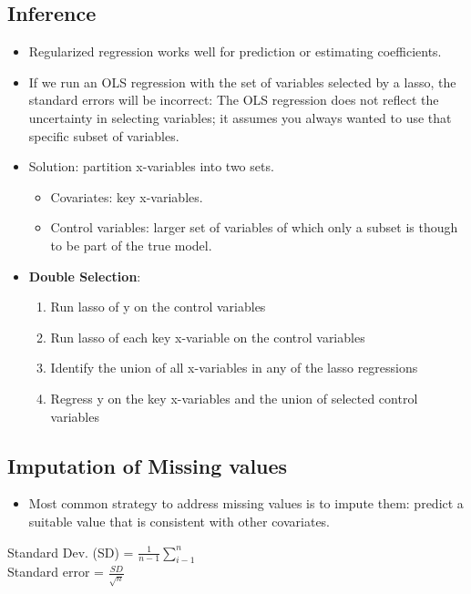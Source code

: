 \documentclass[12pt, oneside]{article}
\begin{document}
\subsection{Inference}
\begin{itemize}
    \item Regularized regression works well for prediction or estimating coefficients. 
    \item If we run an OLS regression with the set of variables selected by a lasso, the standard errors will be incorrect: The OLS regression does
    not reflect the uncertainty in selecting variables; it assumes you always wanted to use that specific subset of variables. 
    \item Solution: partition x-variables into two sets. 
    \begin{itemize}
        \item Covariates: key x-variables.
        \item Control variables: larger set of variables of which only a subset is though to be part of the true model.
    \end{itemize}
    
    \item \textbf{Double Selection}:
    \begin{enumerate}
        \item Run lasso of y on the control variables
        \item Run lasso of each key x-variable on the control variables
        \item Identify the union of all x-variables in any of the lasso regressions
        \item Regress y on the key x-variables and the union of selected control variables
    \end{enumerate}
\end{itemize}

\subsection{Imputation of Missing values}
\begin{itemize}
    \item Most common strategy to address missing values is to impute them: predict a suitable value that is consistent with other covariates.
\end{itemize}

Standard Dev. (SD) = $\frac{1}{n-1}\sum^n_{i-1}$ \\
Standard error = $\frac{SD}{\sqrt{n}}$
\end{document}

